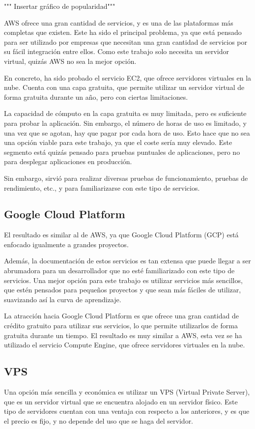 """ Insertar gráfico de popularidad"""

AWS ofrece una gran cantidad de servicios, y es una de las plataformas más completas que existen.
Este ha sido el principal problema, ya que está pensado para ser utilizado por empresas que necesitan una gran cantidad de servicios por su fácil integración entre ellos.
Como este trabajo solo necesita un servidor virtual, quizás AWS no sea la mejor opción.

En concreto, ha sido probado el servicio EC2, que ofrece servidores virtuales en la nube.
Cuenta con una capa gratuita, que permite utilizar un servidor virtual de forma gratuita durante un año, pero con ciertas limitaciones.

La capacidad de cómputo en la capa gratuita es muy limitada, pero es suficiente para probar la aplicación.
Sin embargo, el número de horas de uso es limitado, y una vez que se agotan, hay que pagar por cada hora de uso.
Esto hace que no sea una opción viable para este trabajo, ya que el coste sería muy elevado.
Este segmento está quizás pensado para pruebas puntuales de aplicaciones, pero no para desplegar aplicaciones en producción.

Sin embargo, sirvió para realizar diversas pruebas de funcionamiento, pruebas de rendimiento, etc., y para familiarizarse con este tipo de servicios.


\subsection{Google Cloud Platform}
El resultado es similar al de AWS, ya que Google Cloud Platform (GCP) está enfocado igualmente a grandes proyectos.

Además, la documentación de estos servicios es tan extensa que puede llegar a ser abrumadora para un desarrollador que no esté familiarizado con este tipo de servicios.
Una mejor opción para este trabajo es utilizar servicios más sencillos, que estén pensados para pequeños proyectos y que sean más fáciles de utilizar, suavizando así la curva de aprendizaje.

La atracción hacia Google Cloud Platform es que ofrece una gran cantidad de crédito gratuito para utilizar sus servicios, lo que permite utilizarlos de forma gratuita durante un tiempo.
El resultado es muy similar a AWS, esta vez se ha utilizado el servicio Compute Engine, que ofrece servidores virtuales en la nube.


\subsection{VPS}
Una opción más sencilla y económica es utilizar un VPS (Virtual Private Server), que es un servidor virtual que se encuentra alojado en un servidor físico.
Este tipo de servidores cuentan con una ventaja con respecto a los anteriores, y es que el precio es fijo, y no depende del uso que se haga del servidor.

